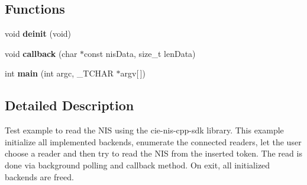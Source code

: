 \subsection*{Functions}
\begin{DoxyCompactItemize}
\item 
\hypertarget{example-nis_8cpp_a69ae4e4b8cbfc3c58977ec9c4daecc65}{void {\bfseries deinit} (void)}\label{example-nis_8cpp_a69ae4e4b8cbfc3c58977ec9c4daecc65}

\item 
\hypertarget{example-nis_8cpp_ae932da1bcc2f2764edc9423e201586f9}{void {\bfseries callback} (char $\ast$const nis\-Data, size\-\_\-t len\-Data)}\label{example-nis_8cpp_ae932da1bcc2f2764edc9423e201586f9}

\item 
\hypertarget{example-nis_8cpp_a9ef43c94a04d3145f5f315231da4526e}{int {\bfseries main} (int argc, \-\_\-\-T\-C\-H\-A\-R $\ast$argv\mbox{[}$\,$\mbox{]})}\label{example-nis_8cpp_a9ef43c94a04d3145f5f315231da4526e}

\end{DoxyCompactItemize}


\subsection{Detailed Description}
Test example to read the N\-I\-S using the cie-\/nis-\/cpp-\/sdk library. This example initialize all implemented backends, enumerate the connected readers, let the user choose a reader and then try to read the N\-I\-S from the inserted token. The read is done via background polling and callback method. On exit, all initialized backends are freed. 